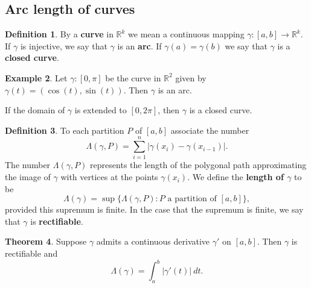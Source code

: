 \documentclass[12pt]{article}
\theoremstyle{definition}
\newtheorem{definition}{Definition}
\newtheorem{example}[definition]{Example}
\theoremstyle{theorem}
\newtheorem{theorem}[definition]{Theorem}
\begin{document}
\subsection{Arc length of curves}

\begin{definition}
By a \textbf{curve} in $\mathbb{R}^k$ we mean a continuous mapping $\gamma : [a,b] \to \mathbb{R}^k$. If $\gamma$ is injective, we say that $\gamma$ is an \textbf{arc}. If $\gamma(a) = \gamma(b)$ we say that $\gamma$ is a \textbf{closed curve}. 
\end{definition}

\begin{example}
Let $\gamma : [0,\pi]$ be the curve in $\mathbb{R}^2$ given by $\gamma(t) = (\cos(t), \sin(t))$. Then $\gamma$ is an arc. 

If the domain of $\gamma$ is extended to $[0,2\pi]$, then $\gamma$ is a closed curve. 
\end{example}


\begin{definition}
To each partition $P$ of $[a,b]$ associate the number 
\[
\Lambda(\gamma, P) = \sum_{i=1}^n |\gamma(x_i) - \gamma(x_{i-1})|.
\]
The number $\Lambda(\gamma,P)$ represents the length of the polygonal path approximating the image of $\gamma$ with vertices at the points $\gamma(x_i)$. We define the \textbf{length of $\gamma$} to be 
\[
\Lambda(\gamma) = \sup\{\Lambda(\gamma,P) : \text{$P$ a partition of $[a,b]$}\},
\]
provided this supremum is finite. In the case that the supremum is finite, we say that $\gamma$ is \textbf{rectifiable}. 
\end{definition}

\begin{theorem}
Suppose $\gamma$ admits a continuous derivative $\gamma'$ on $[a,b]$. Then $\gamma$ is rectifiable and  
\[
\Lambda(\gamma) = \int_a^b |\gamma'(t)| \: dt.
\]
\end{theorem}
\end{document}
